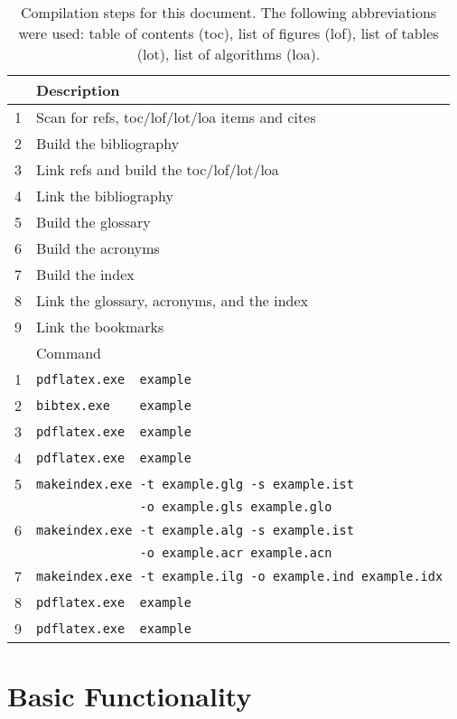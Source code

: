 \begin{table}
  \centering
  \begin{tabular}{rl}
    \toprule
    & Description \\
    \midrule
    1 & Scan for refs, toc/lof/lot/loa items and cites \\
    2 & Build the bibliography     \\
    3 & Link refs and build the toc/lof/lot/loa \\
    4 & Link the bibliography \\
    5 & Build the glossary \\
    6 & Build the acronyms \\
    7 & Build the index \\
    8 & Link the glossary, acronyms, and the index \\
    9 & Link the bookmarks \\
    \midrule
    & Command \\
    \midrule
    1 & \verb|pdflatex.exe  example| \\
    2 & \verb|bibtex.exe    example| \\
    3 & \verb|pdflatex.exe  example| \\
    4 & \verb|pdflatex.exe  example| \\
    5 & \verb|makeindex.exe -t example.glg -s example.ist| \\
      & \verb|              -o example.gls example.glo| \\
    6 & \verb|makeindex.exe -t example.alg -s example.ist| \\
      & \verb|              -o example.acr example.acn| \\
    7 & \verb|makeindex.exe -t example.ilg -o example.ind example.idx| \\
    8 & \verb|pdflatex.exe  example| \\
    9 & \verb|pdflatex.exe  example| \\
    \bottomrule
  \end{tabular}
  \caption{Compilation steps for this document. The following abbreviations were used: table of contents (toc), list of figures (lof), list of tables (lot), list of algorithms (loa).}
  \label{tab:compile} %
\end{table}


\section{Basic Functionality}

